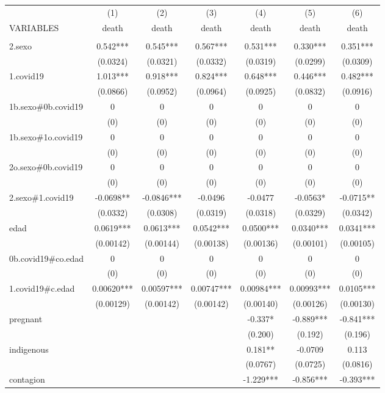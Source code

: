\documentclass[]{article}
\begin{document}
\begin{tabular}{lcccccc} \hline
 & (1) & (2) & (3) & (4) & (5) & (6) \\
VARIABLES & death & death & death & death & death & death \\ \hline
 &  &  &  &  &  &  \\
2.sexo & 0.542*** & 0.545*** & 0.567*** & 0.531*** & 0.330*** & 0.351*** \\
 & (0.0324) & (0.0321) & (0.0332) & (0.0319) & (0.0299) & (0.0309) \\
1.covid19 & 1.013*** & 0.918*** & 0.824*** & 0.648*** & 0.446*** & 0.482*** \\
 & (0.0866) & (0.0952) & (0.0964) & (0.0925) & (0.0832) & (0.0916) \\
1b.sexo\#0b.covid19 & 0 & 0 & 0 & 0 & 0 & 0 \\
 & (0) & (0) & (0) & (0) & (0) & (0) \\
1b.sexo\#1o.covid19 & 0 & 0 & 0 & 0 & 0 & 0 \\
 & (0) & (0) & (0) & (0) & (0) & (0) \\
2o.sexo\#0b.covid19 & 0 & 0 & 0 & 0 & 0 & 0 \\
 & (0) & (0) & (0) & (0) & (0) & (0) \\
2.sexo\#1.covid19 & -0.0698** & -0.0846*** & -0.0496 & -0.0477 & -0.0563* & -0.0715** \\
 & (0.0332) & (0.0308) & (0.0319) & (0.0318) & (0.0329) & (0.0342) \\
edad & 0.0619*** & 0.0613*** & 0.0542*** & 0.0500*** & 0.0340*** & 0.0341*** \\
 & (0.00142) & (0.00144) & (0.00138) & (0.00136) & (0.00101) & (0.00105) \\
0b.covid19\#co.edad & 0 & 0 & 0 & 0 & 0 & 0 \\
 & (0) & (0) & (0) & (0) & (0) & (0) \\
1.covid19\#c.edad & 0.00620*** & 0.00597*** & 0.00747*** & 0.00984*** & 0.00993*** & 0.0105*** \\
 & (0.00129) & (0.00142) & (0.00142) & (0.00140) & (0.00126) & (0.00130) \\
pregnant &  &  &  & -0.337* & -0.889*** & -0.841*** \\
 &  &  &  & (0.200) & (0.192) & (0.196) \\
indigenous &  &  &  & 0.181** & -0.0709 & 0.113 \\
 &  &  &  & (0.0767) & (0.0725) & (0.0816) \\
contagion &  &  &  & -1.229*** & -0.856*** & -0.393*** \\

\end{tabular}
\end{document}
